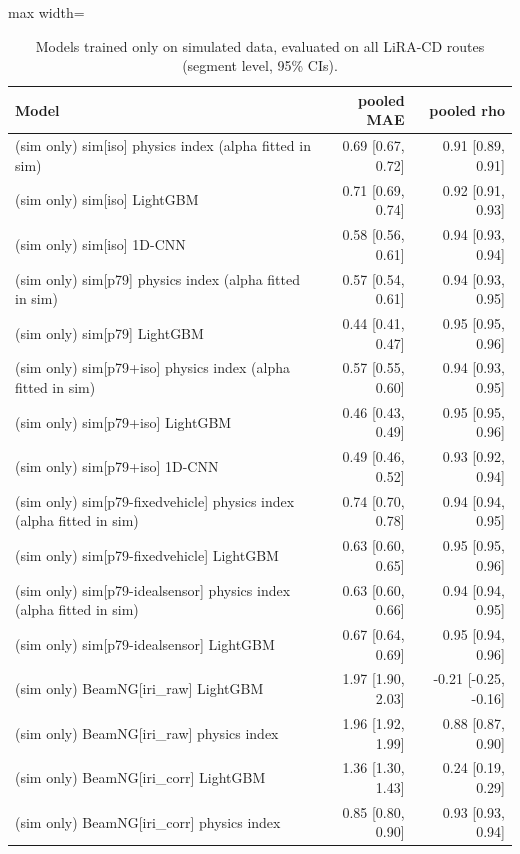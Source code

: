 \begin{table}[!htbp]
\centering
\footnotesize
\caption{Models trained only on simulated data, evaluated on all LiRA-CD routes (segment level, 95\% CIs).}
\label{tab:zeroshot}
\begin{adjustbox}{max width=\columnwidth}
\begin{tabular}{lrr}
\toprule
\textbf{Model} & \textbf{pooled MAE} & \textbf{pooled rho} \\
\midrule
(sim only) sim[iso] physics index (alpha fitted in sim) & 0.69 [0.67, 0.72] & 0.91 [0.89, 0.91] \\
(sim only) sim[iso] LightGBM & 0.71 [0.69, 0.74] & 0.92 [0.91, 0.93] \\
(sim only) sim[iso] 1D-CNN & 0.58 [0.56, 0.61] & 0.94 [0.93, 0.94] \\
(sim only) sim[p79] physics index (alpha fitted in sim) & 0.57 [0.54, 0.61] & 0.94 [0.93, 0.95] \\
(sim only) sim[p79] LightGBM & 0.44 [0.41, 0.47] & 0.95 [0.95, 0.96] \\
(sim only) sim[p79+iso] physics index (alpha fitted in sim) & 0.57 [0.55, 0.60] & 0.94 [0.93, 0.95] \\
(sim only) sim[p79+iso] LightGBM & 0.46 [0.43, 0.49] & 0.95 [0.95, 0.96] \\
(sim only) sim[p79+iso] 1D-CNN & 0.49 [0.46, 0.52] & 0.93 [0.92, 0.94] \\
(sim only) sim[p79-fixedvehicle] physics index (alpha fitted in sim) & 0.74 [0.70, 0.78] & 0.94 [0.94, 0.95] \\
(sim only) sim[p79-fixedvehicle] LightGBM & 0.63 [0.60, 0.65] & 0.95 [0.95, 0.96] \\
(sim only) sim[p79-idealsensor] physics index (alpha fitted in sim) & 0.63 [0.60, 0.66] & 0.94 [0.94, 0.95] \\
(sim only) sim[p79-idealsensor] LightGBM & 0.67 [0.64, 0.69] & 0.95 [0.94, 0.96] \\
(sim only) BeamNG[iri\_raw] LightGBM & 1.97 [1.90, 2.03] & -0.21 [-0.25, -0.16] \\
(sim only) BeamNG[iri\_raw] physics index & 1.96 [1.92, 1.99] & 0.88 [0.87, 0.90] \\
(sim only) BeamNG[iri\_corr] LightGBM & 1.36 [1.30, 1.43] & 0.24 [0.19, 0.29] \\
(sim only) BeamNG[iri\_corr] physics index & 0.85 [0.80, 0.90] & 0.93 [0.93, 0.94] \\
\bottomrule
\end{tabular}
\end{adjustbox}
\end{table}
